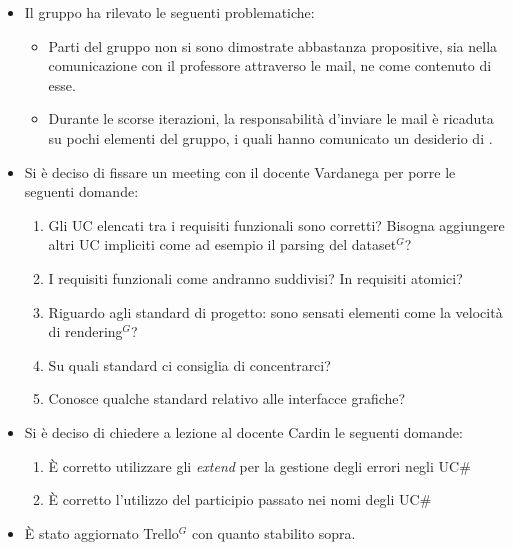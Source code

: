 \begin{itemize}
	\item Il gruppo ha rilevato le seguenti problematiche:
	\begin{itemize}
		\item Parti del gruppo non si sono dimostrate abbastanza propositive, sia nella comunicazione con il professore attraverso le mail, ne come contenuto
		di esse. 
		\item Durante le scorse iterazioni, la responsabilità d'inviare le mail è ricaduta su pochi elementi del gruppo, i quali hanno comunicato un desiderio di .
	\end{itemize}
	\item Si è deciso di fissare un meeting con il docente Vardanega per porre le seguenti domande:
	\begin{enumerate}
		\item Gli UC elencati tra i requisiti funzionali sono corretti? Bisogna aggiungere altri UC impliciti come ad esempio il parsing del dataset$^{G}$?
		\item I requisiti funzionali come andranno suddivisi? In requisiti atomici?
		\item Riguardo agli standard di progetto: sono sensati elementi come la velocità di rendering$^{G}$?
		\item Su quali standard ci consiglia di concentrarci?
		\item Conosce qualche standard relativo alle interfacce grafiche?
	\end{enumerate}
	\item Si è deciso di chiedere a lezione al docente Cardin le seguenti domande:
	\begin{enumerate}
		\item È corretto utilizzare gli \textit{extend} per la gestione degli errori negli UC\#
		\item È corretto l'utilizzo del participio passato nei nomi degli UC\#
	\end{enumerate}
	\item È stato aggiornato Trello$^{G}$ con quanto stabilito sopra.
\end{itemize}